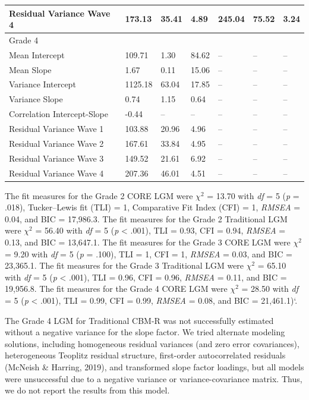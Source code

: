 \documentclass[
  english,
  man, fleqn, noextraspace]{apa6}
\begin{document}
\begin{longtable}{lllllll}
Residual Variance Wave 4 & 173.13 & 35.41 & 4.89 & 245.04 & 75.52 & 3.24 \\ 
\midrule
\multicolumn{1}{l}{Grade 4} \\ 
\midrule
Mean Intercept & 109.71 & 1.30 & 84.62 & -- & -- & -- \\ 
Mean Slope & 1.67 & 0.11 & 15.06 & -- & -- & -- \\ 
Variance Intercept & 1125.18 & 63.04 & 17.85 & -- & -- & -- \\ 
Variance Slope & 0.74 & 1.15 & 0.64 & -- & -- & -- \\ 
Correlation Intercept-Slope & -0.44 & -- & -- & -- & -- & -- \\ 
Residual Variance Wave 1 & 103.88 & 20.96 & 4.96 & -- & -- & -- \\ 
Residual Variance Wave 2 & 167.61 & 33.84 & 4.95 & -- & -- & -- \\ 
Residual Variance Wave 3 & 149.52 & 21.61 & 6.92 & -- & -- & -- \\ 
Residual Variance Wave 4 & 207.36 & 46.01 & 4.51 & -- & -- & -- \\ 
\bottomrule
\end{longtable}

The fit measures for the Grade 2 CORE LGM were \(\chi^2\) = 13.70 with \emph{df} = 5 (\emph{p} = .018), Tucker--Lewis fit (TLI) = 1, Comparative Fit Index (CFI) = 1, \emph{RMSEA} = 0.04, and BIC = 17,986.3. The fit measures for the Grade 2 Traditional LGM were \(\chi^2\) = 56.40 with \emph{df} = 5 (\emph{p} \textless{} .001), TLI = 0.93, CFI = 0.94, \emph{RMSEA} = 0.13, and BIC = 13,647.1. The fit measures for the Grade 3 CORE LGM were \(\chi^2\) = 9.20 with \emph{df} = 5 (\emph{p} = .100), TLI = 1, CFI = 1, \emph{RMSEA} = 0.03, and BIC = 23,365.1. The fit measures for the Grade 3 Traditional LGM were \(\chi^2\) = 65.10 with \emph{df} = 5 (\emph{p} \textless{} .001), TLI = 0.96, CFI = 0.96, \emph{RMSEA} = 0.11, and BIC = 19,956.8. The fit measures for the Grade 4 CORE LGM were \(\chi^2\) = 28.50 with \emph{df} = 5 (\emph{p} \textless{} .001), TLI = 0.99, CFI = 0.99, \emph{RMSEA} = 0.08, and BIC = 21,461.1)`.

The Grade 4 LGM for Traditional CBM-R was not successfully estimated without a negative variance for the slope factor. We tried alternate modeling solutions, including homogeneous residual variances (and zero error covariances), heterogeneous Teoplitz residual structure, first-order autocorrelated residuals (McNeish \& Harring, 2019), and transformed slope factor loadings, but all models were unsuccessful due to a negative variance or variance-covariance matrix. Thus, we do not report the results from this model.
\end{document}
